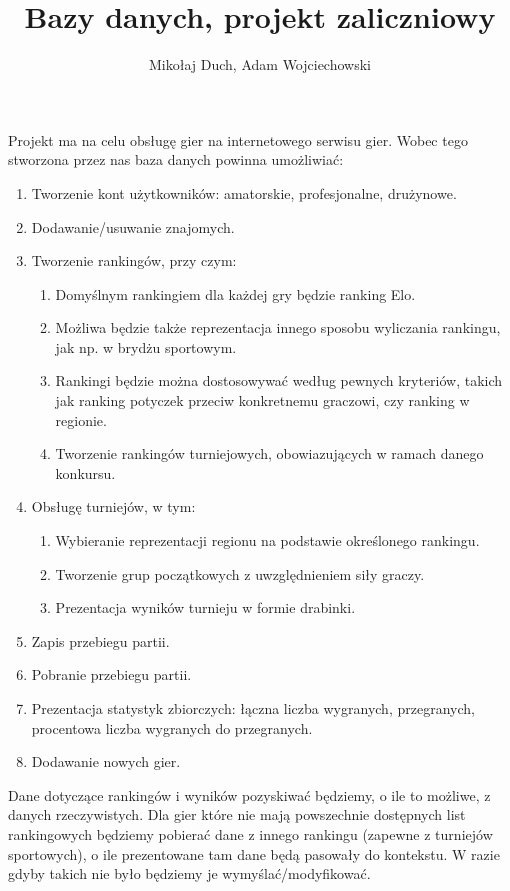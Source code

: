 \documentclass[10pt]{article}
\date{}
\title{\vspace*{-30pt} Bazy danych, projekt zaliczniowy}
\author{Mikołaj Duch, Adam Wojciechowski}
\begin{document}
    \maketitle

    Projekt ma na celu obsługę gier na internetowego serwisu gier. 
    Wobec tego stworzona przez nas baza danych powinna umożliwiać:
    \begin{enumerate}
        \item Tworzenie kont użytkowników: amatorskie, profesjonalne, drużynowe.
        \item Dodawanie/usuwanie znajomych.
        \item Tworzenie rankingów, przy czym:
        \begin{enumerate}
            \item Domyślnym rankingiem dla każdej gry będzie ranking Elo. 
            \item Możliwa będzie także reprezentacja innego sposobu wyliczania rankingu, jak np. w brydżu 
            sportowym.
            \item Rankingi będzie można dostosowywać według pewnych kryteriów, takich jak ranking 
            potyczek przeciw konkretnemu graczowi, czy ranking w regionie.
            \item Tworzenie rankingów turniejowych, obowiazujących w ramach danego konkursu.
        \end{enumerate}
        \item Obsługę turniejów, w tym:
            \begin{enumerate}
                \item Wybieranie reprezentacji regionu na podstawie określonego rankingu.
                \item Tworzenie grup początkowych z uwzględnieniem siły graczy.
                \item Prezentacja wyników turnieju w formie drabinki.
            \end{enumerate}
        \item Zapis przebiegu partii.
        \item Pobranie przebiegu partii.
        \item Prezentacja statystyk zbiorczych: łączna liczba wygranych, przegranych, procentowa liczba wygranych do przegranych.
        \item Dodawanie nowych gier.
    \end{enumerate}

    Dane dotyczące rankingów i wyników pozyskiwać będziemy, o ile to możliwe, z danych rzeczywistych.
    Dla gier które nie mają powszechnie dostępnych list rankingowych będziemy pobierać dane z innego 
    rankingu (zapewne z turniejów sportowych), o ile prezentowane tam dane będą pasowały do kontekstu. 
    W razie gdyby takich nie było będziemy je wymyślać/modyfikować.

    
\end{document}
